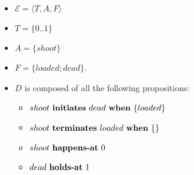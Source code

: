 \begin{itemize}
  \item $\mathcal{E}=\langle T,A,F\rangle$
  \item $T=\{0..1\}$
  \item $A=\{shoot\}$
  \item $F=\{loaded;dead\}$.
  \item $D$ is composed of all the following propositions:
  \begin{itemize}
    \item $shoot \text{ \textbf{initiates} } dead \text{ \textbf{when} } \{loaded\}$
    \item $shoot \text{ \textbf{terminates} } loaded \text{ \textbf{when} } \{\}$
    \item $shoot \text{ \textbf{happens-at} } 0$
    \item $dead \text{ \textbf{holds-at} } 1$
  \end{itemize}
\end{itemize}
